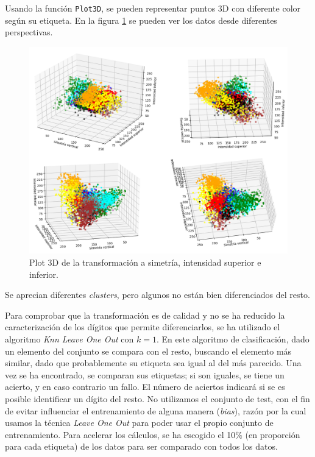 \documentclass[12pt,spanish]{article} %
\begin{document}
Usando la función \texttt{Plot3D}, se pueden representar puntos 3D con diferente color según su etiqueta. En la figura \ref{fig:nube3d} se pueden ver los datos desde diferentes perspectivas.

\begin{figure}[H]
  \begin{center}
  \includegraphics[scale=.5]{nube3d}
  \caption{Plot 3D de la transformación a simetría, intensidad superior e inferior.}
  \label{fig:nube3d}
  \end{center}
\end{figure}

Se aprecian diferentes \textit{clusters}, pero algunos no están bien diferenciados del resto.

Para comprobar que la transformación es de calidad y no se ha reducido la caracterización de los dígitos que permite diferenciarlos, se ha utilizado el algoritmo \textit{Knn Leave One Out} con $k=1$. En este algoritmo de clasificación, dado un elemento del conjunto se compara con el resto, buscando el elemento más similar, dado que probablemente su etiqueta sea igual al del más parecido. Una vez se ha encontrado, se comparan sus etiquetas; si son iguales, se tiene un acierto, y en caso contrario un fallo. El número de aciertos indicará si se es posible identificar un dígito del resto. No utilizamos el conjunto de test, con el fin de evitar influenciar el entrenamiento de alguna manera (\textit{bias}), razón por la cual usamos la técnica \textit{Leave One Out} para poder usar el propio conjunto de entrenamiento. Para acelerar los cálculos, se ha escogido el 10\% (en proporción para cada etiqueta) de los datos para ser comparado con todos los datos.
\end{document}
